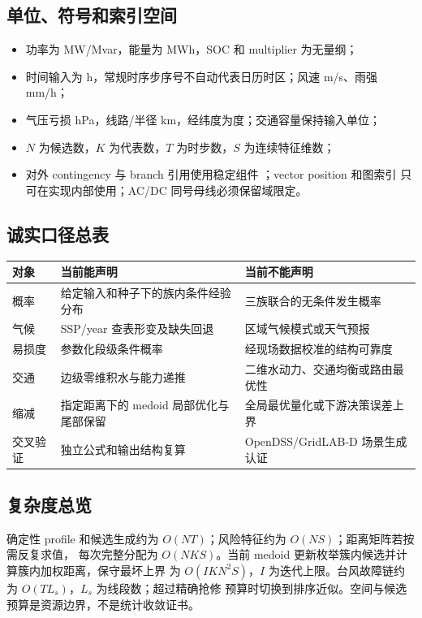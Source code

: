 \subsection{单位、符号和索引空间}
\begin{itemize}
  \item 功率为 MW/Mvar，能量为 MWh，SOC 和 multiplier 为无量纲；
  \item 时间输入为 h，常规时序步序号不自动代表日历时区；风速 m/s、雨强 mm/h；
  \item 气压亏损 hPa，线路/半径 km，经纬度为度；交通容量保持输入单位；
  \item $N$ 为候选数，$K$ 为代表数，$T$ 为时步数，$S$ 为连续特征维数；
  \item 对外 contingency 与 branch 引用使用稳定组件 ；vector position 和图索引
        只可在实现内部使用；AC/DC 同号母线必须保留域限定。
\end{itemize}

\subsection{诚实口径总表}
\begin{center}\small
\begin{tabular}{@{}L{4.3cm}L{5.1cm}L{5.1cm}@{}}
\toprule
对象 & 当前能声明 & 当前不能声明\\
\midrule
概率 & 给定输入和种子下的族内条件经验分布 & 三族联合的无条件发生概率\\
气候 & SSP/year 查表形变及缺失回退 & 区域气候模式或天气预报\\
易损度 & 参数化段级条件概率 & 经现场数据校准的结构可靠度\\
交通 & 边级零维积水与能力递推 & 二维水动力、交通均衡或路由最优性\\
缩减 & 指定距离下的 medoid 局部优化与尾部保留 & 全局最优量化或下游决策误差上界\\
交叉验证 & 独立公式和输出结构复算 & OpenDSS/GridLAB-D 场景生成认证\\
\bottomrule
\end{tabular}
\end{center}

\subsection{复杂度总览}
确定性 profile 和候选生成约为 $O(NT)$；风险特征约为 $O(NS)$；距离矩阵若按需反复求值，
每次完整分配为 $O(NKS)$。当前 medoid 更新枚举簇内候选并计算簇内加权距离，保守最坏上界
为 $O(IKN^2S)$，$I$ 为迭代上限。台风故障链约为 $O(TL_s)$，$L_s$ 为线段数；超过精确抢修
预算时切换到排序近似。空间与候选预算是资源边界，不是统计收敛证书。

